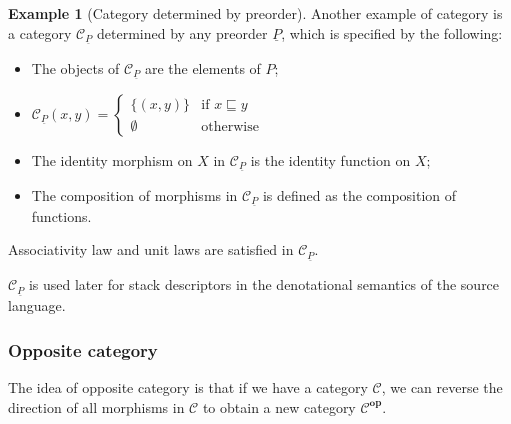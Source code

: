 \documentclass[12pt,twoside,a4paper]{report}
\theoremstyle{definition}
\theoremstyle{definition}
\theoremstyle{definition}
\newtheorem{example}{Example}
\theoremstyle{definition}
\begin{document}
        \begin{example}[Category determined by preorder] \label{ex: category_preorder}
            Another example of category is a category $\mathcal{C}_{\underline{P}}$ determined by any preorder $\underline{P}$, which is specified by the following:
            \begin{itemize}
                \item 
                    The objects of $\mathcal{C}_{\underline{P}}$ are the elements of $P$;
                \item
                    $\mathcal{C}_{\underline{P}}(x,y) = \begin{cases}
                        \{(x,y)\} & \text{if $x \sqsubseteq y$} \\
                        \emptyset & \text{otherwise}
                    \end{cases}$
                \item
                    The identity morphism on $X$ in $\mathcal{C}_{\underline{P}}$ is the identity function on $X$;
                \item
                    The composition of morphisms in $\mathcal{C}_{\underline{P}}$ is defined as the composition of functions.
            \end{itemize}
            Associativity law and unit laws are satisfied in $\mathcal{C}_{\underline{P}}$.

            $\mathcal{C}_{\underline{P}}$ is used later for stack descriptors in the denotational semantics of the source language.
        \end{example}

            \subsubsection{Opposite category}
            The idea of opposite category is that if we have a category $\mathcal{C}$, we can reverse the direction of all morphisms in $\mathcal{C}$ to obtain a new category $\mathcal{C}^{\textbf{op}}$.
\end{document}
